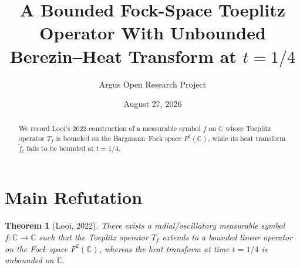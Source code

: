\documentclass[10pt,reqno]{amsart}
\title[Bounded Fock-Space Toeplitz Operators With Unbounded Heat Transform]
{A Bounded Fock-Space Toeplitz Operator With Unbounded Berezin--Heat Transform at $t=1/4$}
\author{Argus Open Research Project}
\date{August 27, 2026}
\newtheorem{theorem}{Theorem}[section]
\theoremstyle{definition}
\begin{document}
\begin{abstract}
We record Looi's 2022 construction of a measurable symbol $f$ on $\mathbb{C}$ whose Toeplitz operator $T_f$ is bounded on the Bargmann--Fock space $F^2(\mathbb{C})$, while its heat transform $\widetilde{f}_{t}$ fails to be bounded at $t=1/4$.
\end{abstract}
\maketitle
\section{Main Refutation}
\begin{theorem}[Looi, 2022]
There exists a radial/oscillatory measurable symbol $f:\mathbb{C}\to\mathbb{C}$ such that the Toeplitz operator $T_f$ extends to a bounded linear operator on the Fock space $F^2(\mathbb{C})$, whereas the heat transform at time $t=1/4$ is unbounded on $\mathbb{C}$.
\end{theorem}
\end{document}
